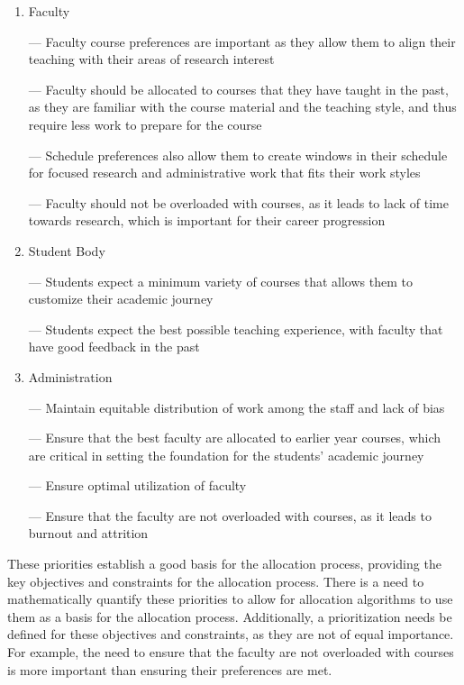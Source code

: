 \begin{enumerate}
  \item Faculty

        — Faculty course preferences are important as they allow them to align their teaching with their areas of research interest

        — Faculty should be allocated to courses that they have taught in the past, as they are familiar with the course material and the teaching style, and thus require less work to prepare for the course

        — Schedule preferences also allow them to create windows in their schedule for focused research and administrative work that fits their work styles

        — Faculty should not be overloaded with courses, as it leads to lack of time towards research, which is important for their career progression

  \item Student Body

        — Students expect a minimum variety of courses that allows them to customize their academic journey

        — Students expect the best possible teaching experience, with faculty that have good feedback in the past

  \item Administration

        — Maintain equitable distribution of work among the staff and lack of bias

        — Ensure that the best faculty are allocated to earlier year courses, which are critical in setting the foundation for the students' academic journey

        — Ensure optimal utilization of faculty

        — Ensure that the faculty are not overloaded with courses, as it leads to burnout and attrition

\end{enumerate}

These priorities establish a good basis for the allocation process, providing the key objectives and constraints for the allocation process. There is a need to mathematically quantify these priorities to allow for allocation algorithms to use them as a basis for the allocation process. Additionally, a prioritization needs be defined for these objectives and constraints, as they are not of equal importance. For example, the need to ensure that the faculty are not overloaded with courses is more important than ensuring their preferences are met.


